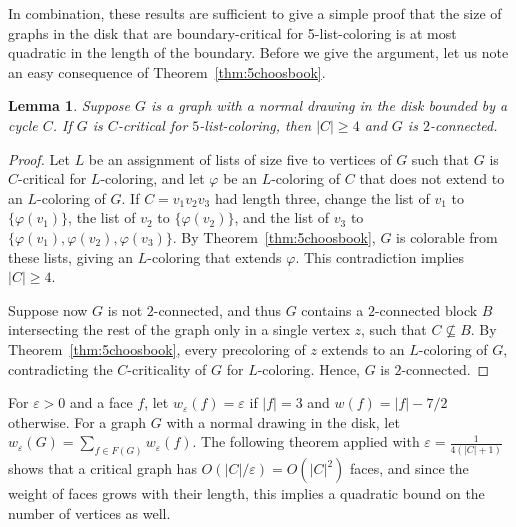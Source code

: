 \documentclass[12pt,twoside,openright,a4paper]{book}
\newtheorem{lemma}[theorem]{Lemma}
\begin{document}
In combination, these results are sufficient to give a simple proof that the size of graphs in the disk that are
boundary-critical for 5-list-coloring is at most quadratic in the length of the boundary.  Before we give the argument,
let us note an easy consequence of Theorem~\ref{thm:5choosbook}.
\begin{lemma}\label{lemma:l5elem}
Suppose $G$ is a graph with a normal drawing in the disk bounded by a cycle $C$.
If $G$ is $C$-critical for $5$-list-coloring, then $|C|\ge 4$ and $G$ is $2$-connected.
\end{lemma}
\begin{proof}
Let $L$ be an assignment of lists of size five to vertices of $G$ such that $G$ is $C$-critical for $L$-coloring,
and let $\varphi$ be an $L$-coloring of $C$ that does not extend to an $L$-coloring of $G$.
If $C=v_1v_2v_3$ had length three, change the list of $v_1$ to $\{\varphi(v_1)\}$, the list
of $v_2$ to $\{\varphi(v_2)\}$, and the list of $v_3$ to $\{\varphi(v_1),\varphi(v_2),\varphi(v_3)\}$.
By Theorem~\ref{thm:5choosbook}, $G$ is colorable from these lists, giving an $L$-coloring that extends $\varphi$.
This contradiction implies $|C|\ge 4$.

Suppose now $G$ is not $2$-connected, and thus $G$ contains a $2$-connected block $B$ intersecting
the rest of the graph only in a single vertex $z$, such that $C\not\subseteq B$.  By Theorem~\ref{thm:5choosbook},
every precoloring of $z$ extends to an $L$-coloring of $G$, contradicting the $C$-criticality of $G$ for $L$-coloring.
Hence, $G$ is $2$-connected.
\end{proof}

For $\varepsilon>0$ and a face $f$, let $w_\varepsilon(f)=\varepsilon$ if $|f|=3$ and $w(f)=|f|-7/2$ otherwise.  For a graph $G$ with a
normal drawing in the disk, let $w_\varepsilon(G)=\sum_{f\in F(G)} w_\varepsilon(f)$.
The following theorem applied with $\varepsilon=\tfrac{1}{4(|C|+1)}$ shows that a critical graph has $O(|C|/\varepsilon)=O(|C|^2)$ faces, and since the weight of faces
grows with their length, this implies a quadratic bound on the number of vertices as well.
\end{document}
